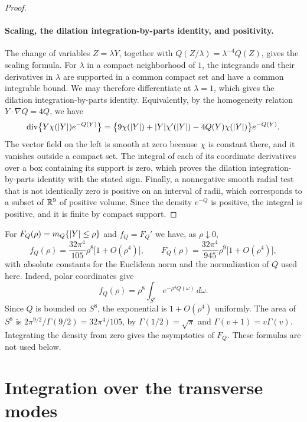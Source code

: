 \begin{proof}
\paragraph{Scaling, the dilation integration-by-parts identity, and positivity.}
The change of variables $Z=\lambda Y$, together with $Q(Z/\lambda)=\lambda^{-4}Q(Z)$, gives the scaling formula. For $\lambda$ in a compact neighborhood of $1$, the integrands and their derivatives in $\lambda$ are supported in a common compact set and have a common integrable bound. We may therefore differentiate at $\lambda=1$, which gives the dilation integration-by-parts identity. Equivalently, by the homogeneity relation $Y\cdot\nabla Q=4Q$, we have
\[
 \operatorname{div}\bigl\{Y\chi(\lvert Y\rvert)e^{-Q(Y)}\bigr\}=\bigl\{9\chi(\lvert Y\rvert)+\lvert Y\rvert\chi'(\lvert Y\rvert)-4Q(Y)\chi(\lvert Y\rvert)\bigr\}e^{-Q(Y)}.
\]
The vector field on the left is smooth at zero because $\chi$ is constant there, and it vanishes outside a compact set. The integral of each of its coordinate derivatives over a box containing its support is zero, which proves the dilation integration-by-parts identity with the stated sign. Finally, a nonnegative smooth radial test that is not identically zero is positive on an interval of radii, which corresponds to a subset of $\mathbb R^9$ of positive volume. Since the density $e^{-Q}$ is positive, the integral is positive, and it is finite by compact support.
\end{proof}

\begin{remark}\label{ch32:rem:small-ball}
For $F_Q(\rho)=m_Q\{\lvert Y\rvert\le\rho\}$ and $f_Q=F_Q'$ we have, as $\rho\downarrow0$,
\[
 f_Q(\rho)=\frac{32\pi^4}{105}\rho^8\bigl[1+O(\rho^4)\bigr],\qquad
 F_Q(\rho)=\frac{32\pi^4}{945}\rho^9\bigl[1+O(\rho^4)\bigr],
\]
with absolute constants for the Euclidean norm and the normalization of $Q$ used here. Indeed, polar coordinates give
\begin{equation}\label{ch32:eq:radial-density}
 f_Q(\rho)=\rho^8\int_{S^8}e^{-\rho^4Q(\omega)}\,d\omega.
\end{equation}
Since $Q$ is bounded on $S^8$, the exponential is $1+O(\rho^4)$ uniformly. The area of $S^8$ is $2\pi^{9/2}/\Gamma(9/2)=32\pi^4/105$, by $\Gamma(1/2)=\sqrt\pi$ and $\Gamma(v+1)=v\Gamma(v)$. Integrating the density from zero gives the asymptotics of $F_Q$. These formulas are not used below.
\end{remark}

\section{Integration over the transverse modes}\label{ch32:sec:integration}

